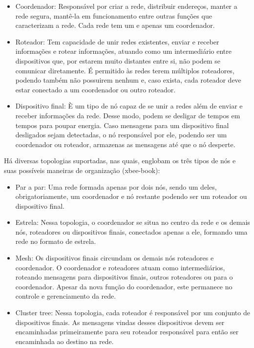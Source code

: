 \documentclass[
	article,			%
	11pt,				%
	oneside,			%
	a4paper,			%
	section=TITLE,		%
	subsection=TITLE,	%
	english,			%
	brazil,				%
	sumario=tradicional
	]{abntex2}
\begin{document}
\begin{itemize} \parskip -4pt
	\item Coordenador: Responsável por criar a rede, distribuir endereços, manter a rede segura, 
	mantê-la em funcionamento entre outras funções que caracterizam a rede. Cada rede tem um e 
	apenas um coordenador.
	\item Roteador: Tem capacidade de unir redes existentes, enviar e receber informações e rotear 
	informações, atuando como um intermediário entre dispositivos que, por estarem muito distantes 
	entre si, não podem se comunicar diretamente. É permitido às redes terem múltiplos roteadores, 
	podendo também não possuirem nenhum e, caso exista, cada roteador deve estar conectado a um 
	coordenador ou outro roteador.
	\item Dispositivo final: È um tipo de nó capaz de se unir a redes além de enviar e receber 
	informações da rede. Desse modo, podem se desligar de tempos em tempos para poupar energia. 
	Caso mensagens para um dispositivo final desligados sejam detectadas, o nó responsável por ele, 
	podendo ser um coordenador ou roteador, armazenas as mensagens até que o nó desperte.
\end{itemize}

Há diversas topologias suportadas, nas quais, englobam os três tipos de nós e suas possíveis 
maneiras de organização (xbee-book):

\begin{itemize} \parskip -4pt
	\item Par a par: Uma rede formada apenas por dois nós, sendo um deles, obrigatoriamente, um 
	coordenador e nó restante podendo ser um roteador ou dispositivo final.
	\item Estrela: Nessa topologia, o coordenador se situa no centro da rede e os demais nós, 
	roteadores ou dispositivos finais, conectados apenas a ele, formando uma rede no formato de 
	estrela.
	\item Mesh: Os dispositivos finais circundam os demais nós roteadores e coordenador. O 
	coordenador e roteadores atuam como intermediários, roteando mensagens para dispositivos 
	finais, outros roteadores ou para o coordenador. Apesar da nova função do coordenador, este 
	permanece no controle e gerenciamento da rede.
	\item Cluster tree: Nessa topologia, cada roteador é responsável por um conjunto de 
	dispositivos finais. As mensagens vindas desses dispositivos devem ser encaminhadas 
	primeiramente para seu roteador responsável para então ser encaminhada ao destino na rede.
\end{itemize}
\end{document}
